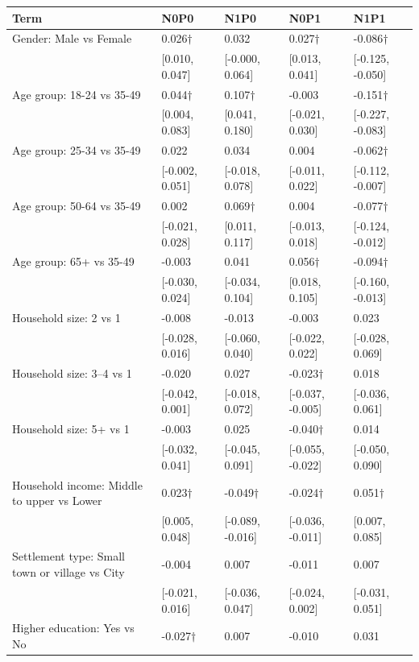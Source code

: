 
\begin{tabular}[t]{lllll}
\toprule
Term & N0P0 & N1P0 & N0P1 & N1P1\\
\midrule
Gender: Male vs Female & 0.026$\dagger$ & 0.032 & 0.027$\dagger$ & -0.086$\dagger$\\
 & {}[0.010, 0.047] & {}[-0.000, 0.064] & {}[0.013, 0.041] & {}[-0.125, -0.050]\\
Age group: 18-24 vs 35-49 & 0.044$\dagger$ & 0.107$\dagger$ & -0.003 & -0.151$\dagger$\\
 & {}[0.004, 0.083] & {}[0.041, 0.180] & {}[-0.021, 0.030] & {}[-0.227, -0.083]\\
Age group: 25-34 vs 35-49 & 0.022 & 0.034 & 0.004 & -0.062$\dagger$\\
 & {}[-0.002, 0.051] & {}[-0.018, 0.078] & {}[-0.011, 0.022] & {}[-0.112, -0.007]\\
Age group: 50-64 vs 35-49 & 0.002 & 0.069$\dagger$ & 0.004 & -0.077$\dagger$\\
 & {}[-0.021, 0.028] & {}[0.011, 0.117] & {}[-0.013, 0.018] & {}[-0.124, -0.012]\\
Age group: 65+ vs 35-49 & -0.003 & 0.041 & 0.056$\dagger$ & -0.094$\dagger$\\
 & {}[-0.030, 0.024] & {}[-0.034, 0.104] & {}[0.018, 0.105] & {}[-0.160, -0.013]\\
Household size: 2 vs 1 & -0.008 & -0.013 & -0.003 & 0.023\\
 & {}[-0.028, 0.016] & {}[-0.060, 0.040] & {}[-0.022, 0.022] & {}[-0.028, 0.069]\\
Household size: 3–4 vs 1 & -0.020 & 0.027 & -0.023$\dagger$ & 0.018\\
 & {}[-0.042, 0.001] & {}[-0.018, 0.072] & {}[-0.037, -0.005] & {}[-0.036, 0.061]\\
Household size: 5+ vs 1 & -0.003 & 0.025 & -0.040$\dagger$ & 0.014\\
 & {}[-0.032, 0.041] & {}[-0.045, 0.091] & {}[-0.055, -0.022] & {}[-0.050, 0.090]\\
Household income: Middle to upper vs Lower & 0.023$\dagger$ & -0.049$\dagger$ & -0.024$\dagger$ & 0.051$\dagger$\\
 & {}[0.005, 0.048] & {}[-0.089, -0.016] & {}[-0.036, -0.011] & {}[0.007, 0.085]\\
Settlement type: Small town or village vs City & -0.004 & 0.007 & -0.011 & 0.007\\
 & {}[-0.021, 0.016] & {}[-0.036, 0.047] & {}[-0.024, 0.002] & {}[-0.031, 0.051]\\
Higher education: Yes vs No & -0.027$\dagger$ & 0.007 & -0.010 & 0.031\\

\end{tabular}
